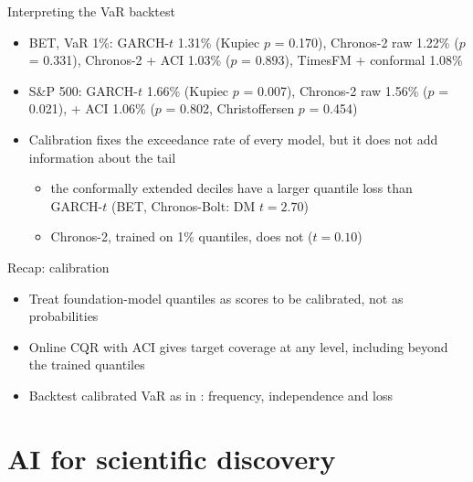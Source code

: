 \begin{frame}{Interpreting the VaR backtest}
\itemsize{\small}
\begin{itemize}
    \item BET, VaR 1\%: GARCH-$t$ 1.31\% (Kupiec $p$ = 0.170), Chronos-2 raw 1.22\% ($p$ = 0.331), Chronos-2 + ACI 1.03\% ($p$ = 0.893), TimesFM + conformal 1.08\%
    \item S\&P 500: GARCH-$t$ 1.66\% (Kupiec $p$ = 0.007), Chronos-2 raw 1.56\% ($p$ = 0.021), + ACI 1.06\% ($p$ = 0.802, Christoffersen $p$ = 0.454)
    \item Calibration fixes the exceedance rate of every model, but it does not add information about the tail
    \begin{itemize}
        \item the conformally extended deciles have a larger quantile loss than GARCH-$t$ (BET, Chronos-Bolt: DM $t = 2.70$)
        \item Chronos-2, trained on 1\% quantiles, does not ($t = 0.10$)
    \end{itemize}
\end{itemize}
\end{frame}

\begin{frame}{Recap: calibration}
\itemsize{\small}
\begin{itemize}
    \item Treat foundation-model quantiles as scores to be calibrated, not as probabilities
    \item Online CQR with ACI gives target coverage at any level, including beyond the trained quantiles
    \item Backtest calibrated VaR as in : frequency, independence and loss
\end{itemize}
\end{frame}


\section{AI for scientific discovery}

